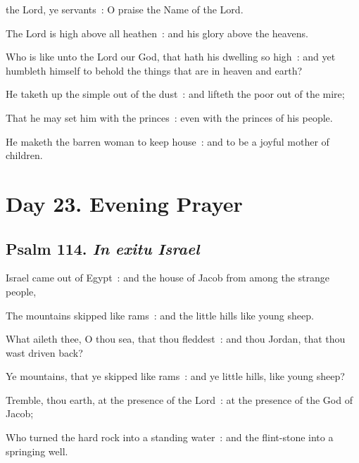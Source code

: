  the Lord, ye servants~: O praise the Name of the Lord.\par
{}
The Lord is high above all heathen~: and his glory above the heavens.\par
{}Who is like unto the Lord our God, that hath his dwelling so high~: and yet humbleth himself to behold the things that are in heaven and earth?\par
{}He taketh up the simple out of the dust~: and lifteth the poor out of the mire;\par
{}That he may set him with the princes~: even with the princes of his people.\par
{}He maketh the barren woman to keep house~: and to be a joyful mother of children.

\clearpage
\section*{Day 23. Evening Prayer}

\subsection{Psalm 114. \textit{In exitu Israel}}

 Israel came out of Egypt~: and the house of Jacob from among the strange people,\par
{}
The mountains skipped like rams~: and the little hills like young sheep.\par
{}What aileth thee, O thou sea, that thou fleddest~: and thou Jordan, that thou wast driven back?\par
{}Ye mountains, that ye skipped like rams~: and ye little hills, like young sheep?\par
{}Tremble, thou earth, at the presence of the Lord~: at the presence of the God of Jacob;\par
{}Who turned the hard rock into a standing water~: and the flint-stone into a springing well.\par

